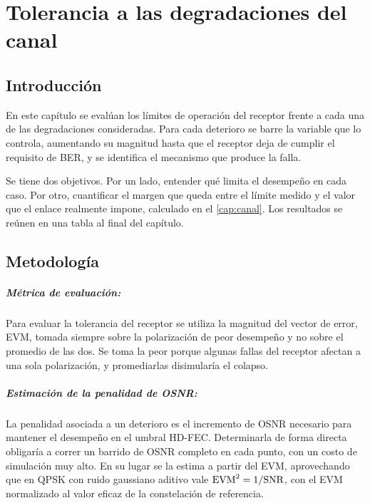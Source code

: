 \chapter{Tolerancia a las degradaciones del canal}
\label{cap:tolerancias}

\section{Introducci\'on}
\label{sec:tol-intro}

En este cap\'itulo se eval\'uan los l\'imites de operaci\'on del receptor
frente a cada una de las degradaciones consideradas. Para cada deterioro se
barre la variable que lo controla, aumentando su magnitud hasta que el
receptor deja de cumplir el requisito de BER, y se identifica el mecanismo
que produce la falla.

Se tiene dos objetivos. Por un lado, entender qu\'e limita el desempe\~no en
cada caso. Por otro, cuantificar el margen que queda entre el l\'imite medido
y el valor que el enlace realmente impone, calculado en el \cref{cap:canal}.
Los resultados se re\'unen en una tabla al final del cap\'itulo.

\section{Metodolog\'ia}
\label{sec:tol-metodologia}

\paragraph{M\'etrica de evaluaci\'on:}
Para evaluar la tolerancia del receptor se utiliza la magnitud del vector de
error, EVM, tomada siempre sobre la polarizaci\'on de peor desempe\~no y no
sobre el promedio de las dos. Se toma la peor porque algunas fallas del
receptor afectan a una sola polarizaci\'on, y promediarlas disimular\'ia el colapso.

\paragraph{Estimaci\'on de la penalidad de OSNR:}
La penalidad asociada a un deterioro es el incremento de OSNR necesario para
mantener el desempe\~no en el umbral HD-FEC. Determinarla de forma directa
obligar\'ia a correr un barrido de OSNR completo en cada punto, con un costo
de simulaci\'on muy alto. En su lugar se la estima a partir del EVM,
aprovechando que en QPSK con ruido gaussiano aditivo vale
$\mathrm{EVM}^{2} = 1/\mathrm{SNR}$, con el EVM normalizado al valor eficaz de la
constelaci\'on de referencia.

